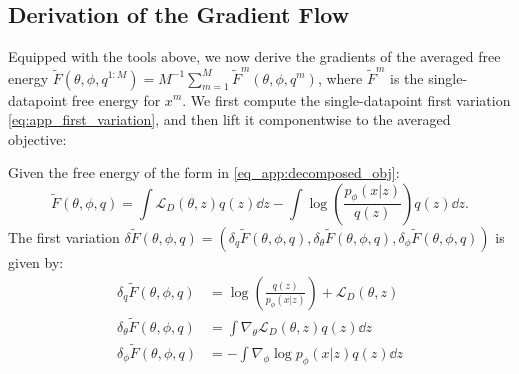 \subsection{Derivation of the Gradient Flow}
\label{app:grad_deriv}
Equipped with the tools above, we now derive the gradients of the averaged free energy $\tilde{F}(\theta, \phi, q^{1:M})=M^{-1}\sum_{m=1}^M \tilde{F}^m(\theta, \phi, q^m)$, where $\tilde{F}^m$ is the single-datapoint free energy for $x^m$. We first compute the single-datapoint first variation \eqref{eq:app_first_variation}, and then lift it componentwise to the averaged objective:
\begin{lemma}\label{app:lemma_1st_var}
     Given the free energy of the form in \eqref{eq_app:decomposed_obj}:
\begin{equation}
    \tilde{F}(\theta, \phi, q)  =  \int \mathcal{L}_D(\theta, z) q(z)\dd z - \int \log \left(\frac{p_\phi( x|z)}{q(z)}\right) q(z)\dd z.
\end{equation}
The first variation $\delta \tilde{F}(\theta, \phi, q)=(\delta_q \tilde{F}(\theta, \phi, q), \delta_\theta \tilde{F}(\theta, \phi, q), \delta_\phi \tilde{F}(\theta, \phi, q))$ is given by:
\begin{align}
    \delta_q \tilde{F}(\theta, \phi, q) &= \log \left(\frac{q(z)}{p_\phi( x|z)}\right) + \mathcal{L}_D(\theta, z)\label{eq_app:1st_var_q}   \\
    \delta_\theta \tilde{F}(\theta, \phi, q) &= \int \nabla_\theta \mathcal{L}_D(\theta, z) q(z) \dd z\label{eq_app:1st_var_theta}  \\
    \delta_\phi \tilde{F}(\theta, \phi, q) &= - \int \nabla_\phi \log p_\phi( x|z) q(z) \dd z\label{eq_app:1st_var_phi} 
\end{align}
\end{lemma}
